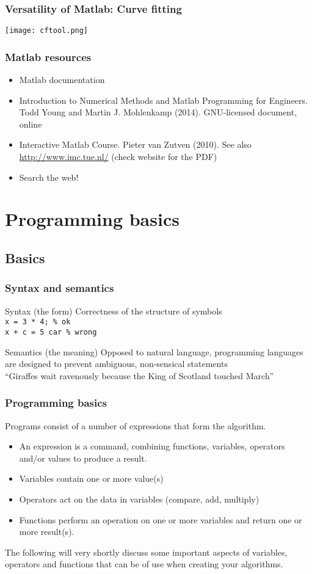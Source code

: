 \documentclass[11pt,table,final,fleqn,xcolor={usenames,dvipsnames}]{beamer}
\begin{document}
\begin{frame}
\frametitle{Versatility of Matlab: Curve fitting}
\texttt{[image: cftool.png]}
\end{frame}

\begin{frame}
\frametitle{Matlab resources}
\begin{itemize}[<+->]
  \item Matlab documentation
  \item Introduction to Numerical Methods and Matlab Programming for Engineers. Todd Young and Martin J. Mohlenkamp (2014). GNU-licensed document, online
  \item Interactive Matlab Course. Pieter van Zutven (2010). See also \url{http://www.imc.tue.nl/} (check website for the PDF)
  \item Search the web!
\end{itemize}
\end{frame}
%
\section{Programming basics}
\subsection*{Basics}
\begin{frame}[fragile]
 \frametitle{Syntax and semantics}
   \begin{block}{Syntax (the form)}
   Correctness of the structure of symbols \\
   \lstinline$x = 3 * 4; % ok$ \\
   \lstinline$x + c = 5 car % wrong$
   \end{block}
  \begin{block}{Semantics (the meaning)}
   Opposed to natural language, programming languages are designed to prevent ambiguous, non-sensical statements  \\
   ``Giraffes wait ravenously because the King of Scotland touched March''
   \end{block}
\end{frame}

\begin{frame}
\frametitle{Programming basics}
Programs consist of a number of expressions that form the algorithm. 
  \begin{itemize}
    \item An expression is a command, combining functions, variables, operators and/or values to produce a result.
    \item Variables contain one or more value(s)
    \item Operators act on the data in variables (compare, add, multiply)
    \item Functions perform an operation on one or more variables and return one or more result(s).
  \end{itemize}
  The following will very shortly discuss some important aspects of variables, operators and functions that can be of use when creating your algorithms.
\end{frame}
\end{document}
